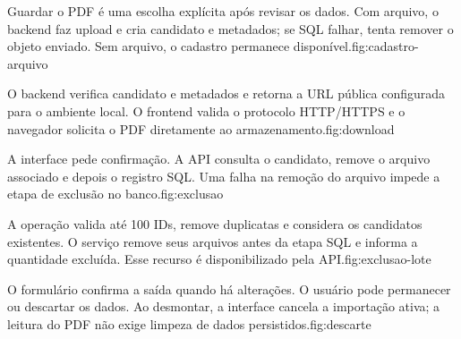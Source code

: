 {Guardar o PDF é uma escolha explícita após revisar os dados. Com arquivo,
o backend faz upload e cria candidato e metadados; se SQL falhar, tenta
remover o objeto enviado. Sem arquivo, o cadastro permanece disponível.}{fig:cadastro-arquivo}

{O backend verifica candidato e metadados e retorna a URL pública configurada
para o ambiente local. O frontend valida o protocolo HTTP/HTTPS e o navegador
solicita o PDF diretamente ao armazenamento.}{fig:download}

{A interface pede confirmação. A API consulta o candidato, remove o arquivo
associado e depois o registro SQL. Uma falha na remoção do arquivo impede
a etapa de exclusão no banco.}{fig:exclusao}

{A operação valida até 100 IDs, remove duplicatas e considera os candidatos
existentes. O serviço remove seus arquivos antes da etapa SQL e informa
a quantidade excluída. Esse recurso é disponibilizado pela API.}{fig:exclusao-lote}

{O formulário confirma a saída quando há alterações. O usuário pode
permanecer ou descartar os dados. Ao desmontar, a interface cancela a
importação ativa; a leitura do PDF não exige limpeza de dados persistidos.}{fig:descarte}
